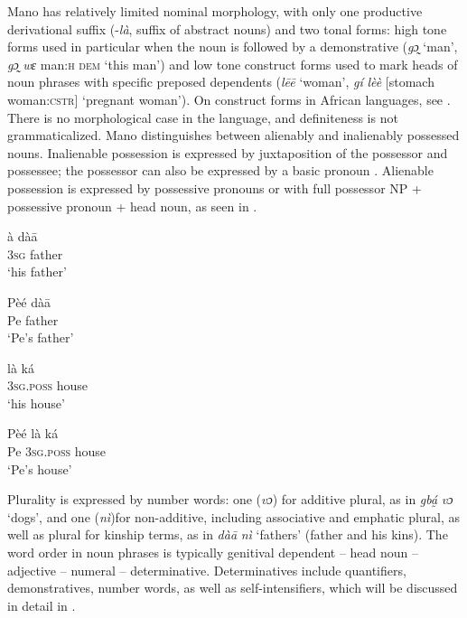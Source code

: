 \documentclass[output=paper]{langscibook}
\begin{document}
Mano has relatively limited nominal morphology, with only one productive derivational suffix (-\textit{là}, suffix of abstract nouns) and two tonal forms: high tone forms used in particular when the noun is followed by a demonstrative (\textit{gɔ̰} ‘man’, \textit{gɔ̰} \textit{wɛ } man:\textsc{h} \textsc{dem} ‘this man’) and low tone construct forms used to mark heads of noun phrases with specific preposed dependents (\textit{lēē} ‘woman’, \textit{gí} \textit{lèè} [stomach woman:\textsc{cstr}] ‘pregnant woman’). On construct forms in African languages, see \citet{CreisselsGood2018}. There is no morphological case in the language, and definiteness is not grammaticalized. Mano distinguishes between alienably and inalienably possessed nouns. Inalienable possession is expressed by juxtaposition of the possessor and possessee; the possessor can also be expressed by a basic pronoun . Alienable possession is expressed by possessive pronouns or with full possessor NP + possessive pronoun + head noun, as seen in . 


 
 \ea
\label{ex:Kachaturyan:3}
    \ea
    \label{ex:Kachaturyan:3a}
    \gll à  dàā\\
     \textsc{3sg}  father\\
    \glt ‘his father’

 \ex
    \label{ex:Kachaturyan:3b}
    \gll Pèé  dàā\\
     Pe  father\\
    \glt ‘Pe's father’\z
\z
    
  \ea
\label{ex:Kachaturyan:4}
    \ea
    \label{ex:Kachaturyan:4a} 
    \gll là  ká\\
     \textsc{3sg.poss}  house\\
    \glt ‘his house’

    \ex
    \label{ex:Kachaturyan:4b} 
    \gll Pèé  là  ká\\
     Pe  \textsc{3sg.poss}  house\\
    \glt ‘Pe’s house’\z
\z

Plurality is expressed by number words: one (\textit{vɔ}) for additive plural, as in \textit{gbá̰} \textit{vɔ} ‘dogs’, and one (\textit{nì})for non-additive, including associative and emphatic plural, as well as plural for kinship terms, as in \textit{dàā} \textit{nì} ‘fathers’ (father and his kins). The word order in noun phrases is typically genitival dependent – head noun – adjective – numeral – determinative. Determinatives include quantifiers, demonstratives, number words, as well as self-intensifiers, which will be discussed in detail in .
\end{document}
